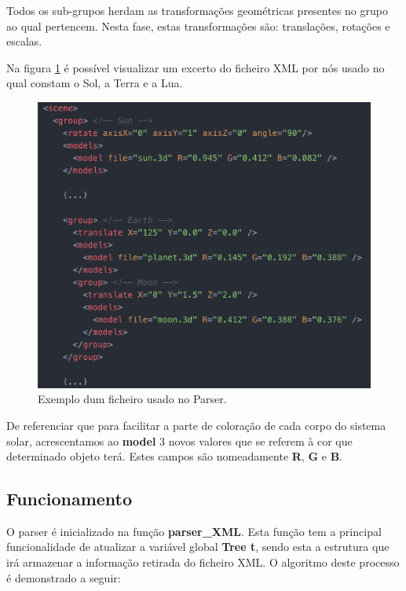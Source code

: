 \documentclass[a4paper]{article}
\begin{document}
Todos os sub-grupos herdam as transformações geométricas presentes no grupo ao qual pertencem. Nesta fase, estas transformações são: translações, rotações e escalas.

Na figura \ref{img:ficheiro_parser} é possível visualizar um excerto do ficheiro XML por nós usado no qual constam o Sol, a Terra e a Lua.

\begin{figure}[H]
\centering
\includegraphics[scale=0.6]{ficheiro_parser.png}
\caption{Exemplo dum ficheiro usado no Parser.}
\label{img:ficheiro_parser}
\end{figure}

De referenciar que para facilitar a parte de coloração de cada corpo do sistema solar, acrescentamos ao \textbf{model} 3 novos valores que se referem à cor que determinado objeto terá. Estes campos são nomeadamente \textbf{R}, \textbf{G} e \textbf{B}.

\subsection{Funcionamento}
\label{sec:funcionamento}

O parser é inicializado na função \textbf{parser\_XML}. Esta função tem a principal funcionalidade de atualizar a variável global \textbf{Tree t}, sendo esta a estrutura que irá armazenar a informação retirada do ficheiro XML. O algoritmo deste processo é demonstrado a seguir:

    \vspace{0.5cm}
\end{document}
